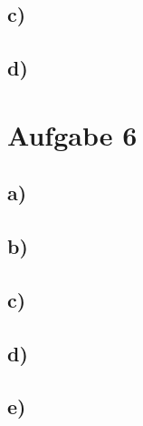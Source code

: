 \subsection{c)}

\subsection{d)}


\section{Aufgabe 6}

\subsection{a)}

\subsection{b)}

\subsection{c)}

\subsection{d)}

\subsection{e)}






